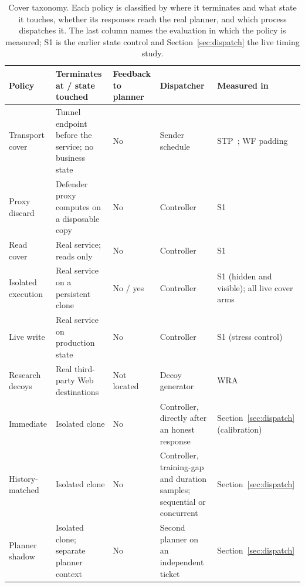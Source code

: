 \begin{table}[t]\centering\small
\caption{Cover taxonomy. Each policy is classified by where it terminates and what state it touches, whether its responses reach the real planner, and which process dispatches it. The last column names the evaluation in which the policy is measured; S1 is the earlier state control and Section~\ref{sec:dispatch} the live timing study.}\label{tab:cover-taxonomy}
\setlength{\tabcolsep}{4pt}
\begin{tabularx}{\textwidth}{@{}P{.17\textwidth}P{.26\textwidth}P{.13\textwidth}P{.2\textwidth}Y@{}}\toprule
Policy & Terminates at / state touched & Feedback to planner & Dispatcher & Measured in \\\midrule
Transport cover & Tunnel endpoint before the service; no business state & No & Sender schedule & STP~\cite{apthorpe2019stp}; WF padding~\cite{juarez2016wtfpad,gong2020front} \\
Proxy discard & Defender proxy computes on a disposable copy & No & Controller & S1 \\
Read cover & Real service; reads only & No & Controller & S1 \\
Isolated execution & Real service on a persistent clone & No / yes & Controller & S1 (hidden and visible); all live cover arms \\
Live write & Real service on production state & No & Controller & S1 (stress control) \\
Research decoys & Real third-party Web destinations & Not located & Decoy generator & WRA~\cite{jeong2026wra} \\\midrule
Immediate & Isolated clone & No & Controller, directly after an honest response & Section~\ref{sec:dispatch} (calibration) \\
History-matched & Isolated clone & No & Controller, training-gap and duration samples; sequential or concurrent & Section~\ref{sec:dispatch} \\
Planner shadow & Isolated clone; separate planner context & No & Second planner on an independent ticket & Section~\ref{sec:dispatch} \\\bottomrule
\end{tabularx}\end{table}
